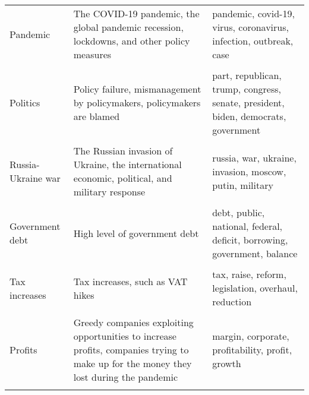 \begin{table}
\begin{scriptsize}
\begin{tabular}[htp]{p{3.5cm}|p{5cm}|p{5cm}}
			Pandemic                 & The COVID-19 pandemic, the   global pandemic recession, lockdowns, and other policy measures                                                    & pandemic, covid-19, virus, coronavirus, infection, outbreak, case                           \\ \\[0.07cm]
			Politics & Policy failure, mismanagement by   policymakers, policymakers are blamed                                                            & part, republican, trump, congress, senate, president, biden, democrats, government\\ \\[0.02cm]
			Russia-Ukraine war       & The Russian invasion of Ukraine,   the international economic, political, and military response                                               & russia, war, ukraine, invasion, moscow, putin, military                           \\ \\[0.02cm]
			Government debt          & High level of government   debt                                                                                                                                                                & debt, public, national, federal, deficit, borrowing, government, balance                                                                   \\ \\[0.02cm]
			Tax increases            & Tax increases, such as VAT   hikes                                                                                                                                                             & tax, raise, reform, legislation, overhaul, reduction\\ \\[0.02cm]
			Profits            & Greedy companies exploiting opportunities to increase profits, companies trying to make up for the money they lost during the pandemic & margin, corporate, profitability, profit, growth      \\ \\[0.02cm] \bottomrule                                                                  
		\end{tabular}
	\end{scriptsize}
\end{table}

